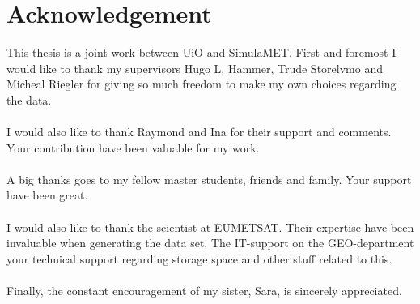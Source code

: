 \chapter*{Acknowledgement}
This thesis is a joint work between UiO and SimulaMET. First and foremost I would like to thank my supervisors Hugo L. Hammer, Trude Storelvmo and Micheal Riegler for giving so much freedom to make my own choices regarding the data.
\\ \\
I would also like to thank Raymond and Ina for their support and comments. Your contribution have been valuable for my work.
\\ \\
A big thanks goes to my fellow master students, friends and family. Your support have been great.
\\ \\ 
I would also like to thank the scientist at EUMETSAT. %
Their expertise have been invaluable when generating the data set. 
The IT-support on the GEO-department your technical support regarding storage space and other stuff related to this. 
\\ \\
Finally, the constant encouragement of my sister, Sara, is sincerely appreciated.
\cleardoublepage